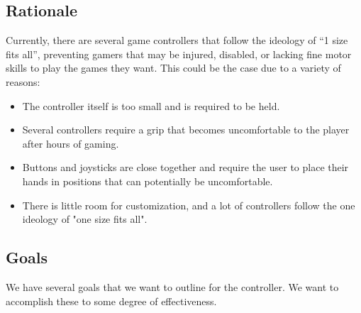 \documentclass[a4]{article}
\begin{document}
\subsection{Rationale}
Currently, there are several game controllers that follow the ideology of “1 size fits all”, preventing gamers that may be injured, disabled, or lacking fine motor
skills to play the games they want. This could be the case due to a variety of reasons:
\begin{itemize}
	\item The controller itself is too small and is required to be held.
	\item Several controllers require a grip that becomes uncomfortable to the player after hours of gaming.
	\item Buttons and joysticks are close together and require the user to place their hands in positions that can potentially be uncomfortable.
	\item There is little room for customization, and a lot of controllers follow the one ideology of "one size fits all".
\end{itemize}

\subsection{Goals}
We have several goals that we want to outline for the controller. We want to accomplish these to some degree of effectiveness.
\end{document}
